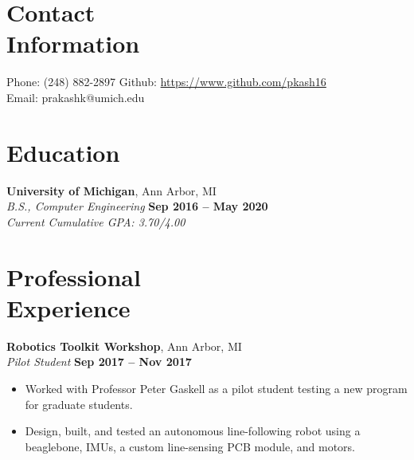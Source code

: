 \documentclass[margin,line]{resume}
\begin{document}
\begin{resume}
    \section{\mysidestyle Contact\\Information}

    Phone: (248) 882-2897       \hfill Github: \url{https://www.github.com/pkash16} \\
    \noindent Email: prakashk@umich.edu  \vspace{0mm}\\\vspace{-4.5mm}

    \section{\mysidestyle Education}

    \textbf{University of Michigan}, Ann Arbor, MI \vspace{2mm}\\\vspace{1mm}%
    \textsl{B.S., Computer Engineering} \hfill \textbf{Sep 2016 -- May 2020}\\
   	\emph{Current Cumulative GPA: 3.70/4.00}

    \section{\mysidestyle Professional\\Experience}
    
    \textbf{Robotics Toolkit Workshop}, Ann Arbor, MI \vspace{2mm}\\\vspace{1mm}%
    \textsl{Pilot Student} \hfill \textbf{Sep 2017 -- Nov 2017}
    \begin{itemize}
    	\item Worked with Professor Peter Gaskell as a pilot student testing a new program for graduate students.
    	\item Design, built, and tested an autonomous line-following robot using a beaglebone, IMUs, a custom line-sensing PCB module, and motors.
    \end{itemize}
    	

\end{resume}
\end{document}
